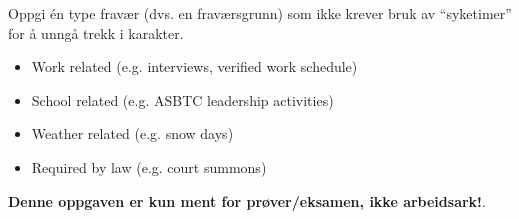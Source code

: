

Oppgi én type fravær (dvs. en fraværsgrunn) som ikke krever bruk av ``syketimer'' for å unngå trekk i karakter.







\begin{itemize}
\item{} Work related (e.g. interviews, verified work schedule)
\item{} School related (e.g. ASBTC leadership activities)
\item{} Weather related (e.g. snow days)
\item{} Required by law (e.g. court summons)
\end{itemize}

 






{\bf Denne oppgaven er kun ment for prøver/eksamen, ikke arbeidsark!}.



